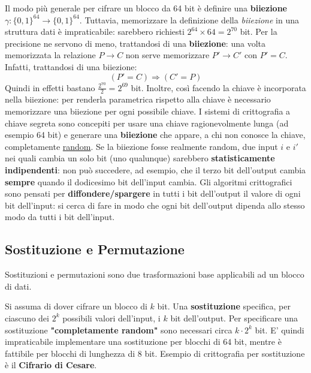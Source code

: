 Il modo più generale per cifrare un blocco da 64 bit è definire una \textbf{biiezione} $\gamma :\{0,1\}^{64} \rightarrow \{0,1\}^{64}$. Tuttavia, memorizzare la definizione della \emph{biiezione} in una struttura dati è impraticabile: sarebbero richiesti $2^{64} \times 64 = 2^{70}$ bit. Per la precisione ne servono di meno, trattandosi di una \textbf{biiezione}: una volta memorizzata la relazione $ P \rightarrow C $ non serve memorizzare $ P' \rightarrow C' $ con $ P' = C $. Infatti, trattandosi di una biiezione:
\begin{equation}
(P' = C) \Rightarrow (C' = P)
\end{equation} 
Quindi in effetti bastano $\frac{2^{70}}{2} = 2^{69}$ bit. Inoltre, così facendo la chiave è incorporata nella biiezione: per renderla parametrica rispetto alla chiave è necessario memorizzare una biiezione per ogni possibile chiave.\newline \newline
I sistemi di crittografia a chiave segreta sono concepiti per usare una chiave ragionevolmente lunga (ad esempio 64 bit) e generare una \textbf{biiezione} che appare, a chi non conosce la chiave, completamente \underline{random}. Se la biiezione fosse realmente random, due input $i$ e $i'$ nei quali cambia un solo bit (uno qualunque) sarebbero \textbf{statisticamente indipendenti}: non può succedere, ad esempio, che il terzo bit dell'output cambia \textbf{sempre} quando il dodicesimo bit dell'input cambia. Gli algoritmi crittografici sono pensati per \textbf{diffondere/spargere} in tutti i bit dell'output il valore di ogni bit dell'input: si cerca di fare in modo che ogni bit dell'output dipenda allo stesso modo da tutti i bit dell'input.

\subsection{Sostituzione e Permutazione}
Sostituzioni e permutazioni sono due trasformazioni base applicabili ad un blocco di dati.\newline \newline

Si assuma di dover cifrare un blocco di $k$ bit. Una \textbf{sostituzione} specifica, per ciascuno dei $2^k$ possibili valori dell'input, i $k$ bit dell'output. Per specificare una sostituzione \textbf{"completamente random"} sono necessari circa $k \cdot 2^k$ bit. E' quindi impraticabile implementare una sostituzione per blocchi di $64$ bit, mentre è fattibile per blocchi di lunghezza di $8$ bit. Esempio di crittografia per sostituzione è il \textbf{Cifrario di Cesare}.\newline \newline

